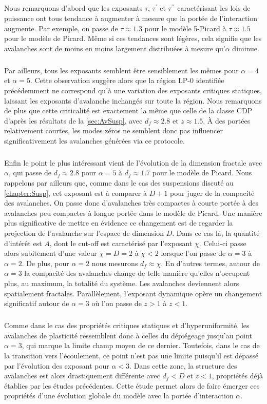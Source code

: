 \subparagraph{}Nous remarquons d'abord que les exposants $\tau$, $\tau^\prime$ et $\tau^{\prime\prime}$ caractérisant les lois de puissance ont tous tendance à augmenter à mesure que la portée de l'interaction augmente. Par exemple, on passe de $\tau\approx 1.3$ pour le modèle 5-Picard à $\tau \approx 1.5$ pour le modèle de Picard. Même si ces tendances sont légères, cela signifie que les avalanches sont de moins en moins largement distribuées à mesure qu'$\alpha$ diminue.

\subparagraph{}Par ailleurs, tous les exposants semblent être sensiblement les mêmes pour $\alpha=4$ et $\alpha=5$. Cette observation suggère alors que la région LP-0 identifiée précédemment ne correspond qu'à une variation des exposants critiques statiques, laissant les exposants d'avalanche inchangés sur toute la région. Nous remarquons de plus que cette criticalité est exactement la même que celle de la classe CDP d'après les résultats de la \autoref{sec:AvSusp}, avec $d_f\approx 2.8$ et $z\approx 1.5$. \`A des portées relativement courtes, les modes zéros ne semblent donc pas influencer significativement les avalanches générées via ce protocole.

\subparagraph{}Enfin le point le plus intéressant vient de l'évolution de la dimension fractale avec $\alpha$, qui passe de $d_f\approx 2.8$ pour $\alpha=5$ à $d_f\approx 1.7$ pour le modèle de Picard. Nous rappelons par ailleurs que, comme dans le cas des suspensions discuté au \autoref{chapter:Susp}, cet exposant est à comparer à $D+1$ pour juger de la compacité des avalanches. On passe donc d'avalanches très compactes à courte portée à des avalanches peu compactes à longue portée dans le modèle de Picard. Une manière plus significative de mettre en évidence ce changement est de regarder la projection de l'avalanche sur l'espace de dimension $D$. Dans ce cas là, la quantité d'intérêt est $A$, dont le cut-off est caractérisé par l'exposant $\chi$. Celui-ci passe alors subitement d'une valeur $\chi=D=2$ à $\chi<2$ lorsque l'on passe de $\alpha=3$ à $\alpha=2$. De plus, pour $\alpha=2$ nous mesurons $d_f\approx\chi$. En d'autres termes, autour de $\alpha=3$ la compacité des avalanches change de telle manière qu'elles n'occupent plus, au maximum, la totalité du système. Les avalanches deviennent alors spatialement fractales. Parallèlement, l'exposant dynamique opère un changement significatif autour de $\alpha=3$ où l'on passe de $z>1$ à $z<1$.

\subparagraph{}Comme dans le cas des propriétés critiques statiques et d'hyperuniformité, les avalanches de plasticité ressemblent donc à celles du dépiégeage jusqu'au point $\alpha = 3$, qui marque la limite champ moyen de ce dernier. Toutefois, dans le cas de la transition vers l'écoulement, ce point n'est pas une limite puisqu'il est dépassé par l'évolution des exposant pour $\alpha<3$. Dans cette zone, la structure des avalanches est alors drastiquement différente avec $d_f<D$ et $z<1$, propriétés déjà établies par les études précédentes. Cette étude permet alors de faire émerger ces propriétés d'une évolution globale du modèle avec la portée d'interaction $\alpha$.


